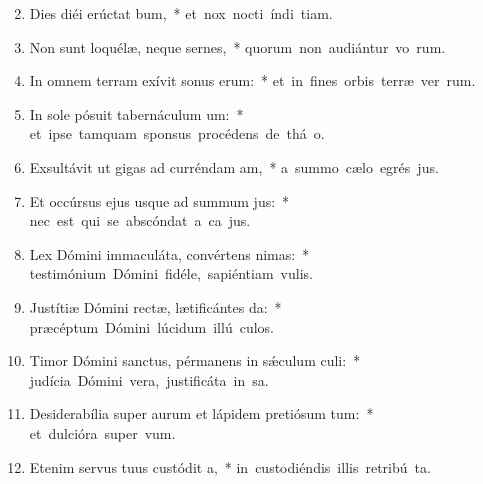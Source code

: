 \begin{flushleft}
\begin{enumerate}[leftmargin=*]
\setcounter{enumi}{1}

\item Dies diéi erúctat bum,~* \mbox{et nox nocti índi tiam.}

\item Non sunt loquélæ, neque sernes,~* \mbox{quorum non audiántur vo rum.}

\item In omnem terram exívit sonus erum:~* \mbox{et in fines orbis terræ ver rum.}

\item In sole pósuit tabernáculum um:~* \mbox{et ipse tamquam sponsus procédens de thá o.}

\item Exsultávit ut gigas ad curréndam am,~* \mbox{a summo cælo egrés jus.}

\item Et occúrsus ejus usque ad summum jus:~* \mbox{nec est qui se abscóndat a ca jus.}

\item Lex Dómini immaculáta, convértens nimas:~* \mbox{testimónium Dómini fidéle, sapiéntiam  vulis.}

\item Justítiæ Dómini rectæ, lætificántes da:~* \mbox{præcéptum Dómini lúcidum illú culos.}

\item Timor Dómini sanctus, pérmanens in sǽculum culi:~* \mbox{judícia Dómini vera, justificáta in sa.}

\item Desiderabília super aurum et lápidem pretiósum tum:~* \mbox{et dulcióra super   vum.}

\item Etenim servus tuus custódit a,~* \mbox{in custodiéndis illis retribú ta.}


\end{enumerate}
\end{flushleft}

